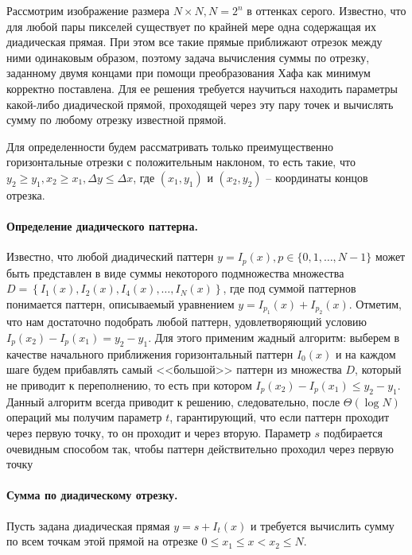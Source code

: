 
Рассмотрим изображение размера $N \times N, N = 2^n$ в оттенках серого. Известно, что для любой пары пикселей существует по крайней мере одна содержащая их диадическая прямая. При этом все такие прямые приближают отрезок между ними одинаковым образом, поэтому задача вычисления суммы по отрезку, заданному двумя концами при помощи преобразования Хафа как минимум корректно поставлена. Для ее решения требуется научиться находить параметры какой-либо диадической прямой, проходящей через эту пару точек и вычислять сумму по любому отрезку известной прямой.

Для определенности будем рассматривать только преимущественно горизонтальные отрезки с положительным наклоном, то есть такие, что $y_2 \ge y_1, x_2 \ge x_1, \Delta y \le \Delta x$, где $(x_1, y_1)$ и $(x_2, y_2)$ -- координаты концов отрезка.

\paragraph{Определение диадического паттерна.}
Известно, что любой диадический паттерн $y = I_p(x), p \in \{ 0, 1, \dots, N-1\}$ может быть представлен в виде суммы некоторого подмножества множества $D = \left\{ I_1(x), I_2(x), I_4(x), \dots, I_N(x) \right\}$, где под суммой паттернов понимается паттерн, описываемый уравнением $y = I_{p_1}(x) + I_{p_2}(x)$. Отметим, что нам достаточно подобрать любой паттерн, удовлетворяющий условию $I_p\left( x_2 \right) - I_p\left( x_1 \right) = y_2 - y_1$. Для этого применим жадный алгоритм: выберем в качестве начального приближения горизонтальный паттерн $I_0(x)$ и на каждом шаге будем прибавлять самый <<большой>> паттерн из множества $D$, который не приводит к переполнению, то есть при котором $I_p\left( x_2 \right) - I_p\left( x_1 \right) \le y_2 - y_1$. Данный алгоритм всегда приводит к решению, следовательно, после $\Theta\left( \log N \right)$ операций мы получим параметр $t$, гарантирующий, что если паттерн проходит через первую точку, то он проходит и через вторую. Параметр $s$ подбирается очевидным способом так, чтобы паттерн действительно проходил через первую точку

\paragraph{Сумма по диадическому отрезку.}
Пусть задана диадическая прямая $y = s + I_t(x)$ и требуется вычислить сумму по всем точкам этой прямой на отрезке $0 \le x_1 \le x < x_2 \le N$.

